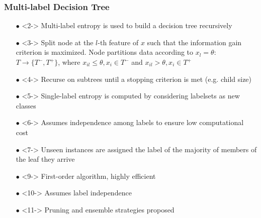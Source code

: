 \documentclass{beamer}
\begin{document}
\begin{frame}
\frametitle{Multi-label Decision Tree}
\begin{itemize}
\item[$\bullet$] <2-> Multi-label entropy is used to build a decision tree recursively
\item[$\bullet$] <3-> Split node at the $l$-th feature of $x$ such that the information gain criterion is maximized. Node partitions data according to $x_l = \theta$:
 $T \rightarrow \{T^-,T^+\}$, where $ x_{il} \leq \theta, x_i \in T^-$ and $ x_{il} > \theta, x_i \in T^+$
\item[$\bullet$] <4-> Recurse on subtrees until a stopping criterion is met (e.g. child size)
\item[$\bullet$] <5-> Single-label entropy is computed by considering labelsets as new classes
\item[$\bullet$] <6-> Assumes independence among labels to ensure low computational cost
\item[$\bullet$] <7-> Unseen instances are assigned the label of the majority of members of the leaf they arrive
\end{itemize}
\begin{itemize}
\item[$\bullet$] <9-> First-order algorithm, highly efficient
\item[$\bullet$] <10-> Assumes label independence
\item[$\bullet$] <11-> Pruning and ensemble strategies proposed
\end{itemize}
\end{frame}
\end{document}
